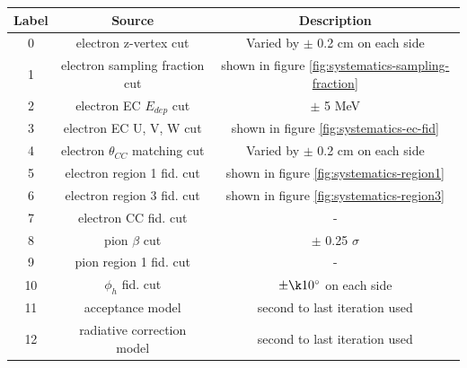 \begin{table}
	\centering
	\label{table:systematic-sources}
	
	\begin{tabular}{c | c | c }
	
	Label & Source & Description \\ 
	\hline 
	
	0      & electron z-vertex cut                          & Varied by $\pm$ 0.2 cm on each side \\ 
	1      & electron sampling fraction cut            & shown in figure \ref{fig:systematics-sampling-fraction} \\ 
	2      & electron EC $E_{dep}$ cut                  & $\pm$ 5 MeV \\ 
	3      & electron EC U, V, W cut                       & shown in figure \ref{fig:systematics-ec-fid} \\ 
	4      & electron $\theta_{CC}$ matching cut & Varied by $\pm$ 0.2 cm on each side \\ 
	5      & electron region 1 fid. cut                      & shown in figure \ref{fig:systematics-region1} \\ 
	6      & electron region 3 fid. cut                     & shown in figure \ref{fig:systematics-region3} \\ 
	7      & electron CC fid. cut                              & - \\ 
	8      & pion $\beta$ cut                                   & $\pm$ 0.25 $\sigma$ \\ 
	9      & pion region 1 fid. cut                             & - \\ 
	10    & $\phi_h$ fid. cut                                    & $\pm \k 10^{\circ}$ on each side \\ 
	11     & acceptance model                                & second to last iteration used \\ 
    12     & radiative correction model                   & second to last iteration used \\ 
	
	\end{tabular}		
	
\end{table}

